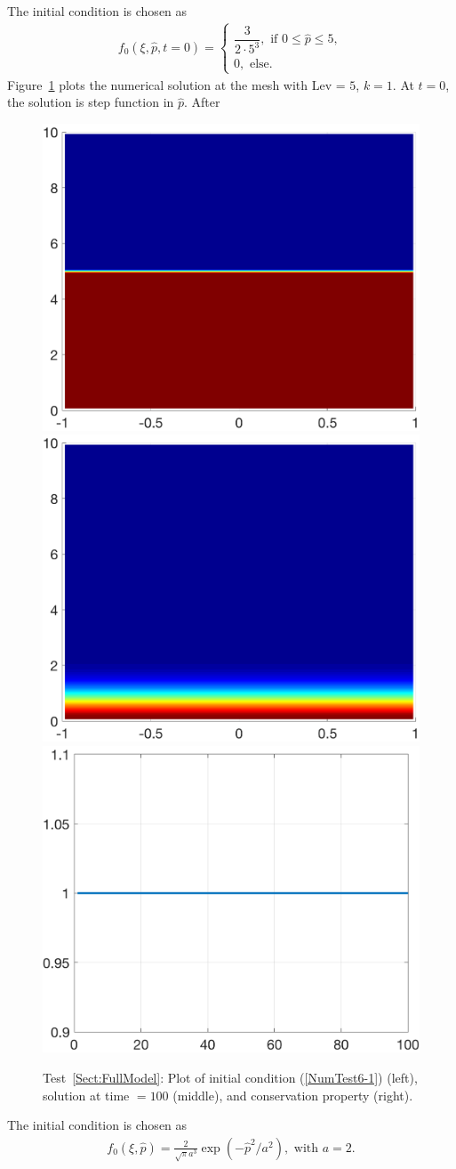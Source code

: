 \documentclass[preprint,11pt]{elsarticle}
\begin{document}
The initial condition is chosen as
\begin{eqnarray}
f_0(\xi,\hat{p},t=0) = \begin{cases}
\dfrac{3}{2\cdot5^3}, \text{ if }0\le \hat{p}\le5,\\
0,\text{ else}.
\end{cases}\label{NumTest6-1}
\end{eqnarray}
Figure~\ref{Fig:NumTest6-1-1} plots the numerical solution at the mesh with Lev = $5$, $k=1$. At $t=0$, the solution is step function in $\hat{p}$. After 

\begin{figure}[H]
\centering
\includegraphics[width=.32\textwidth]{./NumFig/FullModel2D-1-Ini}
\includegraphics[width=.32\textwidth]{./NumFig/FullModel2D-1-100}
\includegraphics[width=.32\textwidth]{./NumFig/FullModel2D-1-Conv}
\caption{Test~\ref{Sect:FullModel}: Plot of initial condition (\ref{NumTest6-1}) (left), solution at time $= 100$ (middle), and conservation property (right).}\label{Fig:NumTest6-1-1}
\end{figure}

The initial condition is chosen as
\begin{eqnarray}
f_0(\xi,\hat{p}) = \frac{2}{\sqrt{\pi}a^3}\exp(-\hat{p}^2/a^2), \text{ with } a = 2.\label{NumTest6-2}
\end{eqnarray}
\end{document}

